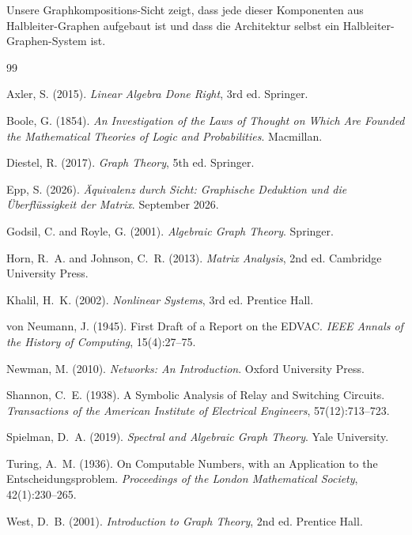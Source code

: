 \documentclass[12pt, a4paper]{article}
\theoremstyle{definition}
\theoremstyle{remark}
\begin{document}
Unsere Graphkompositions-Sicht zeigt, dass jede dieser Komponenten aus Halbleiter-Graphen aufgebaut ist und dass die Architektur selbst ein Halbleiter-Graphen-System ist.


\begin{thebibliography}{99}

Axler, S. (2015).
\newblock \textit{Linear Algebra Done Right}, 3rd ed.
\newblock Springer.

Boole, G. (1854).
\newblock \textit{An Investigation of the Laws of Thought on Which Are Founded the Mathematical Theories of Logic and Probabilities}.
\newblock Macmillan.

Diestel, R. (2017).
\newblock \textit{Graph Theory}, 5th ed.
\newblock Springer.

Epp, S. (2026).
\newblock \textit{Äquivalenz durch Sicht: Graphische Deduktion und die Überflüssigkeit der Matrix}.
\newblock September 2026.

Godsil, C. and Royle, G. (2001).
\newblock \textit{Algebraic Graph Theory}.
\newblock Springer.

Horn, R.~A. and Johnson, C.~R. (2013).
\newblock \textit{Matrix Analysis}, 2nd ed.
\newblock Cambridge University Press.

Khalil, H.~K. (2002).
\newblock \textit{Nonlinear Systems}, 3rd ed.
\newblock Prentice Hall.

von Neumann, J. (1945).
\newblock First Draft of a Report on the EDVAC.
\newblock \textit{IEEE Annals of the History of Computing}, 15(4):27--75.

Newman, M. (2010).
\newblock \textit{Networks: An Introduction}.
\newblock Oxford University Press.

Shannon, C.~E. (1938).
\newblock A Symbolic Analysis of Relay and Switching Circuits.
\newblock \textit{Transactions of the American Institute of Electrical Engineers}, 57(12):713--723.

Spielman, D.~A. (2019).
\newblock \textit{Spectral and Algebraic Graph Theory}.
\newblock Yale University.

Turing, A.~M. (1936).
\newblock On Computable Numbers, with an Application to the Entscheidungsproblem.
\newblock \textit{Proceedings of the London Mathematical Society}, 42(1):230--265.

West, D.~B. (2001).
\newblock \textit{Introduction to Graph Theory}, 2nd ed.
\newblock Prentice Hall.

\end{thebibliography}
\end{document}
